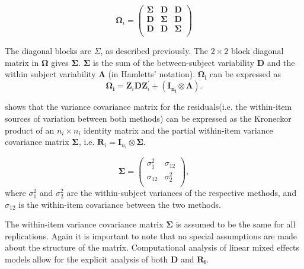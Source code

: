 \documentclass[12pt, a4paper]{report}
\theoremstyle{plain}
\theoremstyle{definition}
\theoremstyle{remark}
\begin{document}
	\[
	\boldsymbol{\Omega}_{i} = \left(
	\begin{array}{ccc}
	\boldsymbol{\Sigma} & \boldsymbol{D} & \boldsymbol{D}\\
	\boldsymbol{D} & \boldsymbol{\Sigma} & \boldsymbol{D}\\
	\boldsymbol{D} & \boldsymbol{D} & \boldsymbol{\Sigma}\\
	\end{array}\right)
	\]
	
	The diagonal blocks are $\Sigma$, as described previously. The $2 \times 2$ block diagonal matrix in $\boldsymbol{\Omega}$ gives $\boldsymbol{\Sigma}$. $\boldsymbol{\Sigma}$ is the sum of the between-subject variability $\boldsymbol{D}$ and the within subject variability $\boldsymbol{\Lambda}$ (in Hamletts' notation). $\boldsymbol{\Omega_{i}}$ can be expressed as
	\[
	\boldsymbol{\Omega_{i}} = \boldsymbol{Z}_{i}\boldsymbol{D}\boldsymbol{Z}_{i}^\prime + ({\boldsymbol{I_{n_{i}}} \otimes \boldsymbol{\Lambda}}).
	\]
	
	\citet{hamlett} shows that the variance covariance matrix for the residuals(i.e. the within-item sources of variation between both methods) can be expressed as the Kroneckor product of an $n_i \times n_i$ identity matrix and the partial within-item variance covariance matrix $\boldsymbol{\Sigma}$, i.e. $\boldsymbol{R}_{i} = \boldsymbol{I}_{n_{i}} \otimes \boldsymbol{\Sigma}$.
	
	\[
	\boldsymbol{\Sigma} = \left( \begin{array}{cc}
	\sigma^2_{1} & \sigma_{12} \\
	\sigma_{12} & \sigma^2_{2} \\
	\end{array}\right),
	\]
	where $\sigma^2_{1}$ and $\sigma^2_{2}$ are the within-subject variances of the respective methods, and $\sigma_{12}$ is the within-item covariance between the two methods. 
	
	The within-item variance covariance matrix $\boldsymbol{\Sigma}$ is assumed to be the same for all replications.  Again it is important to note that no special assumptions are made about the structure of the matrix. Computational analysis of linear mixed effects models allow for the explicit analysis of both $\boldsymbol{D}$ and $\boldsymbol{R_i}$.
	
\end{document}
